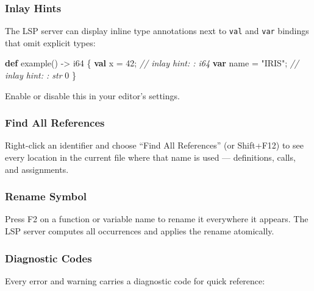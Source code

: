 \documentclass[
  english,
]{book}
\newenvironment{Shaded}{\begin{snugshade}}{\end{snugshade}}
\newcommand{\CommentTok}[1]{\textcolor[rgb]{0.42,0.60,0.33}{\textit{#1}}}
\newcommand{\DataTypeTok}[1]{\textcolor[rgb]{0.31,0.79,0.69}{#1}}
\newcommand{\DecValTok}[1]{\textcolor[rgb]{0.71,0.81,0.66}{#1}}
\newcommand{\KeywordTok}[1]{\textcolor[rgb]{0.34,0.61,0.84}{\textbf{#1}}}
\newcommand{\NormalTok}[1]{\textcolor[rgb]{0.83,0.83,0.83}{#1}}
\newcommand{\OperatorTok}[1]{\textcolor[rgb]{0.83,0.83,0.83}{#1}}
\newcommand{\StringTok}[1]{\textcolor[rgb]{0.81,0.57,0.47}{#1}}
\begin{document}
\subsubsection{Inlay Hints}\label{inlay-hints}

The LSP server can display inline type annotations next to \texttt{val}
and \texttt{var} bindings that omit explicit types:

\begin{Shaded}
\begin{Highlighting}[]
\KeywordTok{def}\NormalTok{ example() }\OperatorTok{{-}\textgreater{}} \DataTypeTok{i64}\NormalTok{ \{}
    \KeywordTok{val}\NormalTok{ x }\OperatorTok{=} \DecValTok{42}\NormalTok{;          }\CommentTok{// inlay hint: \textasciigrave{}: i64\textasciigrave{}}
    \KeywordTok{var}\NormalTok{ name }\OperatorTok{=} \StringTok{"IRIS"}\NormalTok{;   }\CommentTok{// inlay hint: \textasciigrave{}: str\textasciigrave{}}
    \DecValTok{0}
\NormalTok{\}}
\end{Highlighting}
\end{Shaded}

Enable or disable this in your editor's settings.

\subsubsection{Find All References}\label{find-all-references}

Right-click an identifier and choose ``Find All References'' (or
Shift+F12) to see every location in the current file where that name is
used --- definitions, calls, and assignments.

\subsubsection{Rename Symbol}\label{rename-symbol}

Press F2 on a function or variable name to rename it everywhere it
appears. The LSP server computes all occurrences and applies the rename
atomically.

\subsubsection{Diagnostic Codes}\label{diagnostic-codes}

Every error and warning carries a diagnostic code for quick reference:
\end{document}
